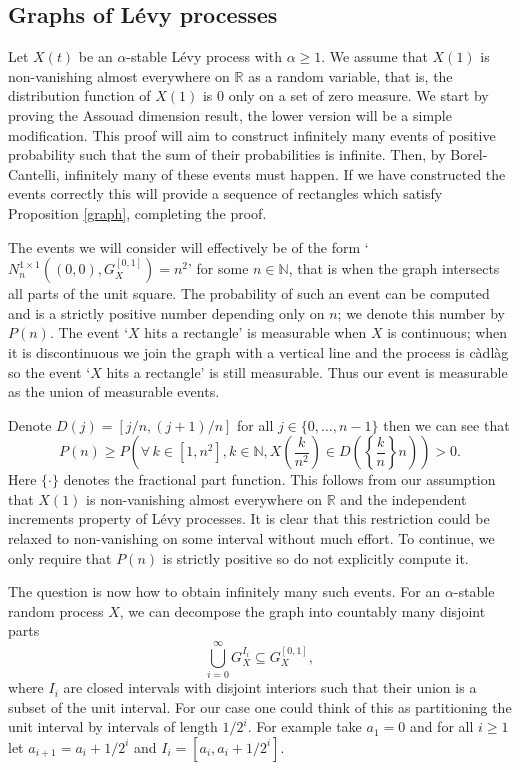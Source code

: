 \subsection{Graphs of L\'evy processes}\label{LP}

Let $X(t)$ be an $\alpha$-stable L\'evy process with $\alpha \ge 1$. We assume that $X(1)$ is non-vanishing almost everywhere on $\mathbb{R}$ as a random variable, that is, the distribution function of $X(1)$ is 0 only on a set of zero measure. We start by proving the Assouad dimension result, the lower version will be a simple modification. This proof will aim to construct infinitely many events of positive probability such that the sum of their probabilities is infinite. Then, by Borel-Cantelli, infinitely many of these events must happen. If we have constructed the events correctly this will provide a sequence of rectangles which satisfy Proposition \ref{graph}, completing the proof.

The events we will consider will effectively be of the form `$N_{n}^{1 \times 1 }((0,0),G_X^{[0,1]})=n^2$' for some $n\in \mathbb{N}$, that is when the graph intersects all parts of the unit square. The probability of such an event can be computed and is a strictly positive number depending only on $n$; we denote this number by $P(n)$. The event `$X$ hits a rectangle' is measurable when $X$ is continuous; when it is discontinuous we join the graph with a vertical line and the process is c\`adl\`ag so the event `$X$ hits a rectangle' is still measurable. Thus our event is measurable as the union of measurable events. 

Denote $D(j)=[j/n,(j+1)/n]$ for all $j\in\{0,\dots, n-1\}$ then we can see that
\[
P(n)\geq P\left(\forall \, k\in\left[1,n^2\right], k\in \mathbb{N},X\left(\frac{k}{n^2}\right)\in D\left(\left\{\frac{k}{n}\right\}n\right)\right)>0.
\]
Here $\{ \cdot \}$ denotes the fractional part function. This follows from our assumption that $X(1)$ is non-vanishing almost everywhere on $\mathbb{R}$ and the independent increments property of L\'evy processes. It is clear that this restriction could be relaxed to non-vanishing on some interval without much effort. To continue, we only require that $P(n)$ is strictly positive so do not explicitly compute it.


The question is now how to obtain infinitely many such events. For an $\alpha$-stable random process $X$, we can decompose the graph into countably many disjoint parts
\[
\bigcup_{i=0}^\infty G_X^{I_i}\subseteq G_X^{[0,1]},
\]
where $I_i$ are closed intervals with disjoint interiors such that their union is a subset of the unit interval. For our case one could think of this as partitioning the unit interval by intervals of length $1/2^i$. For example take $a_1=0$ and for all $i\geq 1$ let $a_{i+1}=a_i+1/2^i$ and $I_i=[a_i,a_i+1/2^{i}].$

